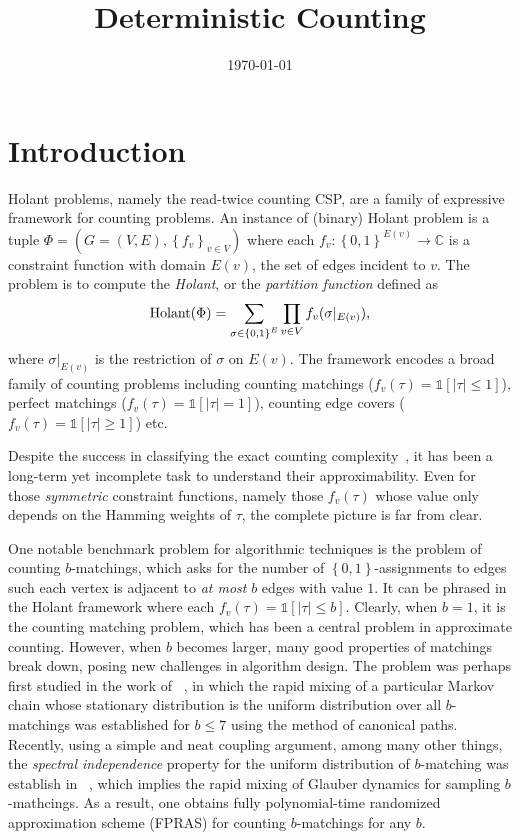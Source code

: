 \documentclass[11pt]{article}
\title{Deterministic Counting}
\author{}
\date{\today}
\newcommand{\abs}[1]{\left\vert#1\right\vert}
\newcommand{\set}[1]{\left\{#1\right\}}
\newcommand{\id}[1]{\mathbb{1}\left[#1\right]}
\newcommand{\bb}{\mathbb}
\newcommand{\ctodo}[1]{\todo[color = lime!40, size=tiny]{\textbf{Chihao:} #1}}
\begin{document}
\maketitle

\section{Introduction}

Holant problems, namely the read-twice counting CSP, are a family of expressive framework for counting problems. An instance of (binary) Holant problem is a tuple $\Phi=(G=(V,E),\set{f_v}_{v\in V})$ where each $f_v:\set{0,1}^{E(v)}\to \bb C$ is a constraint function with domain $E(v)$, the set of edges incident to $v$. The problem is to compute the \emph{Holant}, or the \emph{partition function} defined as \ctodo{use $E(v)$ or $E_v$?}
\[
    \-{Holant}(\Phi) = \sum_{\sigma\in\set{0,1}^E} \prod_{v\in V}f_v(\sigma|_{E(v)}),
\]
where $\sigma|_{E(v)}$ is the restriction of $\sigma$ on $E(v)$. The framework encodes a broad family of counting problems including counting matchings ($f_v(\tau) = \id{\abs{\tau}\le 1}$), perfect matchings ($f_v(\tau) = \id{\abs{\tau}= 1}$), counting edge covers ($f_v(\tau) = \id{\abs{\tau}\ge 1}$) etc. 

Despite the success in classifying the exact counting complexity~\cite{}, it has been a long-term yet incomplete task to understand their approximability. Even for those \emph{symmetric} constraint functions, namely those $f_v(\tau)$ whose value only depends on the Hamming weights of $\tau$, the complete picture is far from clear. 

One notable benchmark problem for algorithmic techniques is the problem of counting $b$-matchings, which asks for the number of $\set{0,1}$-assignments to edges such each vertex is adjacent to \emph{at most} $b$ edges with value $1$. It can be phrased in the Holant framework where each $f_v(\tau)=\id{\abs{\tau}\le b}$. Clearly, when $b=1$, it is the counting matching problem, which has been a central problem in approximate counting. However, when $b$ becomes larger, many good properties of matchings break down, posing new challenges in algorithm design. The problem was perhaps first studied in the work of ~\cite{}, in which the rapid mixing of a particular Markov chain whose stationary distribution is the uniform distribution over all $b$-matchings was established for $b\le 7$ using the method of canonical paths. Recently, using a simple and neat coupling argument, among many other things, the \emph{spectral independence} property for the uniform distribution of $b$-matching was establish in ~\cite{}, which implies the rapid mixing of Glauber dynamics for sampling $b$-mathcings. As a result, one obtains fully polynomial-time randomized approximation scheme (FPRAS) for counting $b$-matchings for any $b$.
\end{document}
